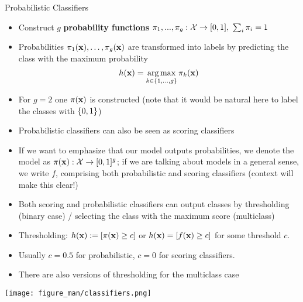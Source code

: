 \documentclass[11pt,compress,t,notes=noshow, xcolor=table]{beamer}
\begin{document}
\begin{vbframe}{Probabilistic Classifiers}
\begin{itemize}
\item Construct $g$ \textbf{probability functions} $\pi_1, ..., \pi_g: \Xspace \to [0, 1],~\sum_i \pi_i = 1$ 
\item Probabilities $\pi_1(\xv), \ldots, \pikx[g]$ are transformed into labels by predicting the class with the maximum probability
$$
\hx = \argmax_{k \in \gset} \pikx
$$ 
\item For $g = 2$ one $\pix$ is constructed (note that it would be natural here to label the classes with $\setzo$)

\item Probabilistic classifiers can also be seen as scoring classifiers

\item If we want to emphasize that our model outputs probabilities, we denote the model as $\pix: \Xspace \to [0, 1]^g$; if we are talking about models in a general sense, we write $f$, comprising both probabilistic and scoring classifiers (context will make this clear!) 
\end{itemize}

\framebreak 


\begin{itemize}
\item Both scoring and probabilistic classifiers can output classes by thresholding (binary case) / selecting the class with the maximum score (multiclass)
\item Thresholding: $\hx:= [\pix \ge c]$ or $\hx = [\fx \ge c]$ for some threshold $c$.
\item Usually $c = 0.5$ for probabilistic, $c = 0$ for scoring classifiers.
\item There are also versions of thresholding for the multiclass case

\end{itemize}

\begin{center}
  \texttt{[image: figure\_man/classifiers.png]}
\end{center}

\end{vbframe} 
\end{document}

